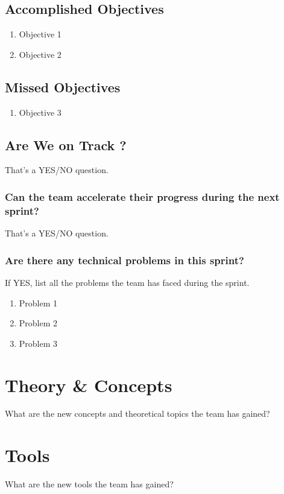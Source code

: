 \documentclass[10pt, b5paper]{article}
\begin{document}
\subsection{Accomplished Objectives}
\begin{enumerate}
\item Objective 1
\item Objective 2
\end{enumerate}

\subsection{Missed Objectives}
\begin{enumerate}
\item Objective 3
\end{enumerate}

\subsection{Are We on Track ? }
That's a YES/NO question. 

\subsubsection{Can the team accelerate their progress during the next sprint?}
That's a YES/NO question. 

\subsubsection{Are there any technical problems in this sprint?}
If YES, list all the problems the team has faced during the sprint.  
\begin{enumerate}
\item Problem 1
\item Problem 2
\item Problem 3
\end{enumerate}


\section{Theory \& Concepts}
What are the new concepts and theoretical topics the team has gained? 

\section{Tools}
What are the new tools the team has gained? 
\end{document}
